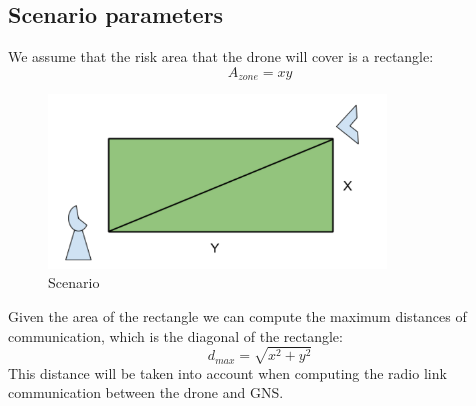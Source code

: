 \subsection{Scenario parameters}
We assume that the risk area that the drone will cover is a rectangle:
\begin{equation*}\label{eq:scenario_parameters1} 
 		A_{zone} = xy
\end{equation*}

\begin{figure}[hb]
  	\centering
 	\includegraphics[width=0.8\textwidth]{figures/pic1.png}
  	\caption[Pipeline survey]{Scenario}
\end{figure}

Given the area of the rectangle we can compute the maximum distances of communication, which is the diagonal of the rectangle: 
\begin{equation*}\label{eq:scenario_parameters2} 
 		d_{max} = \sqrt{x^2 + y^2}
\end{equation*}
This distance will be taken into account when computing the radio link communication between the drone and GNS.
